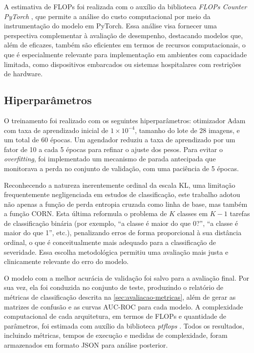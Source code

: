 A estimativa de FLOPs foi realizada com o auxílio da biblioteca \textit{FLOPs Counter PyTorch} \cite{ptflops}, que permite a análise do custo computacional por meio da instrumentação do modelo em PyTorch. Essa análise visa fornecer uma perspectiva complementar à avaliação de desempenho, destacando modelos que, além de eficazes, também são eficientes em termos de recursos computacionais, o que é especialmente relevante para implementação em ambientes com capacidade limitada, como dispositivos embarcados ou sistemas hospitalares com restrições de hardware.

\subsection{Hiperparâmetros}

O treinamento foi realizado com os seguintes hiperparâmetros: otimizador Adam com taxa de aprendizado inicial de $1 \times 10^{-4}$, tamanho do lote de 28 imagens, e um total de 60 épocas. Um agendador reduziu a taxa de aprendizado por um fator de 10 a cada 5 épocas para refinar o ajuste dos pesos. Para evitar o \textit{overfitting}, foi implementado um mecanismo de parada antecipada que monitorava a perda no conjunto de validação, com uma paciência de 5 épocas.

Reconhecendo a natureza inerentemente ordinal da escala KL, uma limitação frequentemente negligenciada em estudos de classificação, este trabalho adotou não apenas a função de perda entropia cruzada como linha de base, mas também a função CORN. Esta última reformula o problema de $K$ classes em $K-1$ tarefas de classificação binária (por exemplo, ``a classe é maior do que 0?'', ``a classe é maior do que 1'', etc.), penalizando erros de forma proporcional à sua distância ordinal, o que é conceitualmente mais adequado para a classificação de severidade. Essa escolha metodológica permitiu uma avaliação mais justa e clinicamente relevante do erro do modelo.

O modelo com a melhor acurácia de validação foi salvo para a avaliação final. Por sua vez, ela foi conduzida no conjunto de teste, produzindo o relatório de métricas de classificação descrita na \autoref{sec:avaliacao-metricas}, além de gerar as matrizes de confusão e as curvas AUC-ROC para cada modelo. A complexidade computacional de cada arquitetura, em termos de FLOPs e quantidade de parâmetros, foi estimada com auxílio da biblioteca \textit{ptflops} \cite{ptflops}. Todos os resultados, incluindo métricas, tempos de execução e medidas de complexidade, foram armazenados em formato JSON para análise posterior.

